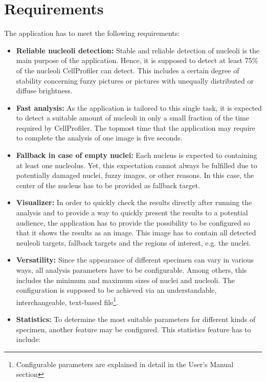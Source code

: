 \documentclass[a4paper, 12pt, twoside]{article}
\begin{document}
\section{Requirements}\label{sec:requirements}
The application has to meet the following requirements:
\begin{itemize}
  \item \textbf{Reliable nucleoli detection:} Stable and reliable detection of
  nucleoli is the main purpose of the application. Hence, it is supposed to
  detect at least 75\% of the nucleoli CellProfiler can detect. This includes
  a certain degree of stability concerning fuzzy pictures or pictures with
  unequally distributed or diffuse brightness.
  \item \textbf{Fast analysis:} As the application is tailored to this single
  task, it is expected to detect a suitable amount of nucleoli in only a small
  fraction of the time required by CellProfiler. The topmost time that the
  application may require to complete the analysis of one image is five seconds.
  \item \textbf{Fallback in case of empty nuclei:} Each nucleus is expected to
  containing at least one nucleolus. Yet, this expectation cannot always be
  fulfilled due to potentially damaged nuclei, fuzzy images, or other reasons.
  In this case, the center of the nucleus has to be provided as fallback target.
  \item \textbf{Visualizer:} In order to quickly check the results directly
  after running the analysis and to provide a way to quickly present the results
  to a potential audience, the application has to provide the possibility to be
  configured so that it shows the results as an image. This image has to contain
  all detected neuleoli targets, fallback targets and the regions of interest,
  e.g. the nuclei.
  \item \textbf{Versatility:} Since the appearance of different specimen can
  vary in various ways, all analysis parameters have to be configurable. Among
  others, this includes the minimum and maximum sizes of nuclei and nucleoli.
  The configuration is supposed to be achieved via an understandable,
  interchangeable, text-based file\footnote{Configurable parameters are
  explained in detail in the User's Manual section}.
  \item \textbf{Statistics:} To determine the most suitable parameters for
  different kinds of specimen, another feature may be configured. This
  statistics feature has to include:
  \begin{itemize}

\end{itemize}
\end{itemize}
\end{document}
